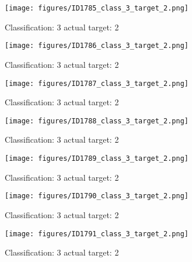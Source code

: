 \begin{figure}[h!]
\begin{center}
\texttt{[image: figures/ID1785\_class\_3\_target\_2.png]}
\end{center}
\caption{ Classification: 3 actual target: 2}
\label{fig:ID1785_class_3_target_2}
\end{figure}
\begin{figure}[h!]
\begin{center}
\texttt{[image: figures/ID1786\_class\_3\_target\_2.png]}
\end{center}
\caption{ Classification: 3 actual target: 2}
\label{fig:ID1786_class_3_target_2}
\end{figure}
\begin{figure}[h!]
\begin{center}
\texttt{[image: figures/ID1787\_class\_3\_target\_2.png]}
\end{center}
\caption{ Classification: 3 actual target: 2}
\label{fig:ID1787_class_3_target_2}
\end{figure}
\begin{figure}[h!]
\begin{center}
\texttt{[image: figures/ID1788\_class\_3\_target\_2.png]}
\end{center}
\caption{ Classification: 3 actual target: 2}
\label{fig:ID1788_class_3_target_2}
\end{figure}
\begin{figure}[h!]
\begin{center}
\texttt{[image: figures/ID1789\_class\_3\_target\_2.png]}
\end{center}
\caption{ Classification: 3 actual target: 2}
\label{fig:ID1789_class_3_target_2}
\end{figure}
\begin{figure}[h!]
\begin{center}
\texttt{[image: figures/ID1790\_class\_3\_target\_2.png]}
\end{center}
\caption{ Classification: 3 actual target: 2}
\label{fig:ID1790_class_3_target_2}
\end{figure}
\begin{figure}[h!]
\begin{center}
\texttt{[image: figures/ID1791\_class\_3\_target\_2.png]}
\end{center}
\caption{ Classification: 3 actual target: 2}
\label{fig:ID1791_class_3_target_2}
\end{figure}

